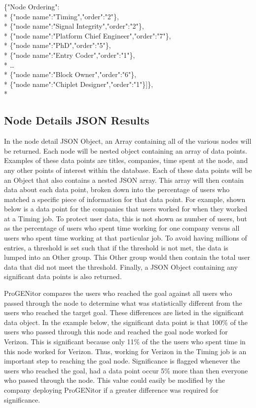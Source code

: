 \begin{tt}
\begin{footnotesize}
\noindent \{"Node Ordering":\\*
	\indent\{"node	name":"Timing","order":"2"\},\\*
	\indent\{"node name":"Signal Integrity","order":"2"\},\\*
	\indent\{"node name":"Platform Chief Engineer","order":"7"\},\\*
	\indent\{"node name":"PhD","order":"5"\},\\*
	\indent\{"node name":"Entry Coder","order":"1"\},\\*
	\indent\ldots\\*
	\indent\{"node name":"Block Owner","order":"6"\},\\*
	\indent\{"node name":"Chiplet Designer","order":"1"\}]\},\\*
\end{footnotesize}
\end{tt}

\subsection{Node Details JSON Results}
In the node detail JSON Object, an Array containing all of the various nodes
will be returned.  Each node will be nested object containing an array of data
points.  Examples of these data points are titles, companies, time spent at the
node, and any other points of interest within the database.  Each of these data
points will be an Object that also contains a nested JSON array.  This array
will then contain data about each data point, broken down into the percentage of
users who matched a specific piece of information for that data point.  For
example, shown below is a data point for the companies that users worked for
when they worked at a Timing job.  To protect user data, this is not shown as
number of users, but as the percentage of users who spent time working for one
company versus all users who spent time working at that particular job.  To
avoid having millions of entries, a threshold is set such that if the threshold
is not met, the data is lumped into an Other group.  This Other group would then
contain the total user data that did not meet the threshold.  Finally, a JSON
Object containing any significant data points is also returned.  

ProGENitor compares the users who reached the goal against all users who passed
through the node to determine what was statistically different from the users
who reached the target goal.  These differences are listed in the significant
data object. In the example below, the significant data point is that 100\% of
the users who passed through this node and reached the goal node worked for
Verizon.  This is significant because only 11\% of the the users who spent time
in this node worked for Verizon.  Thus, working for Verizon in the Timing job is
an important step to reaching the goal node.  Significance is flagged whenever
the users who reached the goal, had a data point occur 5\% more than then
everyone who passed through the node.  This value could easily be modified by
the company deploying ProGENitor if a greater difference was required for significance.

